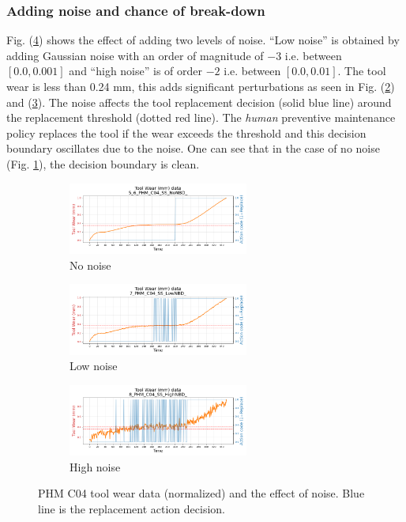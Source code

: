 \documentclass[a4paper, 12pt]{article}
\begin{document}
\subsubsection*{Adding noise and chance of break-down}
Fig. (\ref{fig:noise}) shows the effect of adding two levels of noise. ``Low noise'' is obtained by adding Gaussian noise with an order of magnitude of $-3$ i.e. between $[0.0, 0.001]$ and ``high noise'' is of order $-2$ i.e. between $[0.0, 0.01]$. The tool wear is less than 0.24 mm, this adds significant perturbations as seen in Fig. (\ref{fig:LBD}) and (\ref{fig:HBD}). The noise affects the tool replacement decision (solid blue line) around the replacement threshold (dotted red line). The \textit{human} preventive maintenance policy replaces the tool if the wear exceeds the threshold and this decision boundary oscillates due to the noise. One can see that in the case of no noise (Fig. \ref{fig:NBD}), the decision boundary is clean.

\begin{figure}[htbp]
	\begin{subfigure}[b]{\textwidth}
		\centering
		\includegraphics[width=0.65\textwidth]{PHM_C04_NoNBD_wear_plot.png}  
		\caption{No noise}
		\label{fig:NBD}
	\end{subfigure}
	\begin{subfigure}[b]{\textwidth}
		\centering
		\includegraphics[width=0.65\textwidth]{PHM_C04_LowNBD_wear_plot.png}  
		\caption{Low noise}
		\label{fig:LBD}
	\end{subfigure}
	\begin{subfigure}[b]{\textwidth}
		\centering
		\includegraphics[width=0.65\textwidth]{PHM_C04_HighNBD_wear_plot.png}  
		\caption{High noise}
		\label{fig:HBD}
	\end{subfigure}
	\caption{PHM C04 tool wear data (normalized) and the effect of noise. Blue line is the replacement action decision.}
	\label{fig:noise}
\end{figure}
\end{document}
